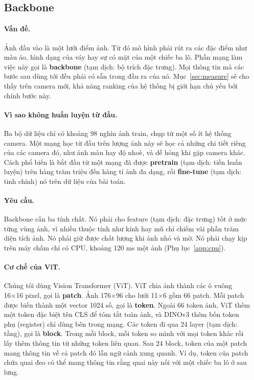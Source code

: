 \documentclass[11pt,a4paper]{article}
\begin{document}
\subsection{Backbone}
\label{sec:backbone}

\paragraph{Vấn đề.} Ảnh đầu vào là một lưới điểm ảnh. Từ đó mô hình phải rút ra các đặc điểm như màu áo, hình dạng của váy hay sự có mặt của một chiếc ba lô. Phần mạng làm việc này gọi là \textbf{backbone} (tạm dịch: bộ trích đặc trưng). Mọi thông tin mà các bước sau dùng tới đều phải có sẵn trong đầu ra của nó. Mục~\ref{sec:measure} sẽ cho thấy trên camera mới, khả năng ranking của hệ thống bị giới hạn chủ yếu bởi chính bước này.

\paragraph{Vì sao không huấn luyện từ đầu.} Ba bộ dữ liệu chỉ có khoảng 98 nghìn ảnh train, chụp từ một số ít hệ thống camera. Một mạng học từ đầu trên lượng ảnh này sẽ học cả những chi tiết riêng của các camera đó, như ánh màu hay độ nhoè, và dễ hỏng khi gặp camera khác. Cách phổ biến là bắt đầu từ một mạng đã được \textbf{pretrain} (tạm dịch: tiền huấn luyện) trên hàng trăm triệu đến hàng tỉ ảnh đa dạng, rồi \textbf{fine-tune} (tạm dịch: tinh chỉnh) nó trên dữ liệu của bài toán.

\paragraph{Yêu cầu.} Backbone cần ba tính chất. Nó phải cho feature (tạm dịch: đặc trưng) tốt ở mức từng vùng ảnh, vì nhiều thuộc tính như kính hay mũ chỉ chiếm vài phần trăm diện tích ảnh. Nó phải giữ được chất lượng khi ảnh nhỏ và mờ. Nó phải chạy kịp trên máy chấm chỉ có CPU, khoảng 120 ms một ảnh (Phụ lục~\ref{app:cpu}).

\paragraph{Cơ chế của ViT.} Chúng tôi dùng Vision Transformer (ViT). ViT chia ảnh thành các ô vuông 16×16 pixel, gọi là \textbf{patch}. Ảnh 176×96 cho lưới 11×6 gồm 66 patch. Mỗi patch được biến thành một vector 1024 số, gọi là \textbf{token}. Ngoài 66 token ảnh, ViT thêm một token đặc biệt tên CLS để tóm tắt toàn ảnh, và DINOv3 thêm bốn token phụ (register) chỉ dùng bên trong mạng. Các token đi qua 24 layer (tạm dịch: tầng), gọi là \textbf{block}. Trong mỗi block, mỗi token so mình với mọi token khác rồi lấy thêm thông tin từ những token liên quan. Sau 24 block, token của một patch mang thông tin về cả patch đó lẫn ngữ cảnh xung quanh. Ví dụ, token của patch chứa quai đeo có thể mang thông tin rằng quai này nối với một chiếc ba lô ở sau lưng.
\end{document}
